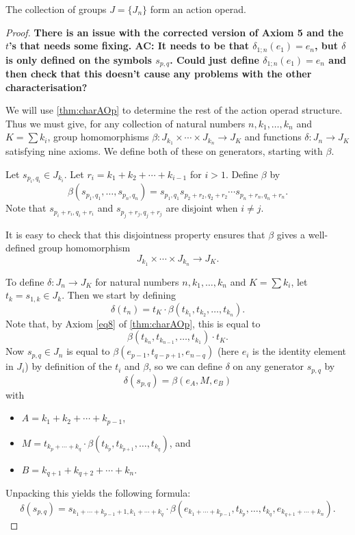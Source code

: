 \begin{thm}\label{J_aop}
The collection of groups $J = \{ J_{n} \}$ form an action operad.
\end{thm}
\begin{proof}
\textbf{There is an issue with the corrected version of Axiom 5 and the $t$'s that needs some fixing. AC: It needs to be that $\delta_{1;n}(e_1) = e_n$, but $\delta$ is only defined on the symbols $s_{p,q}$. Could just define $\delta_{1;n}(e_1) = e_n$ and then check that this doesn't cause any problems with the other characterisation?}

We will use \cref{thm:charAOp} to determine the rest of the action operad structure. Thus we must give, for any collection of natural numbers $n, k_{1}, \ldots, k_{n}$ and $K = \sum k_{i}$, group homomorphisms $\beta \colon J_{k_{1}} \times \cdots \times J_{k_{n}} \rightarrow J_{K}$ and functions $\delta \colon J_{n} \rightarrow J_{K}$ satisfying nine axioms. We define both of these on generators, starting with $\beta$.

Let $s_{p_{i}, q_{i}} \in J_{k_{i}}$. Let $r_{i} = k_{1} + k_{2} + \cdots + k_{i-1}$ for $i > 1$. Define $\beta$ by
  \[
    \beta(s_{p_{1}, q_{1}}, \ldots, s_{p_{n}, q_{n}}) = s_{p_{1}, q_{1}} s_{p_{2}+r_{2}, q_{2}+r_{2}} \cdots s_{p_{n}+r_{n}, q_{n}+r_{n}}.
  \]
Note that $s_{p_{i}+r_{i}, q_{i}+r_{i}}$ and $s_{p_{j}+r_{j}, q_{j}+r_{j}}$ are disjoint when $i \neq j$.

It is easy to check that this disjointness property ensures that $\beta$ gives a well-defined group homomorphism
  \[
    J_{k_{1}} \times \cdots \times J_{k_{n}} \rightarrow J_{K}.
  \]

To define $\delta \colon J_{n} \rightarrow J_{K}$ for natural numbers $n, k_{1}, \ldots, k_{n}$ and $K = \sum k_{i}$, let $t_{k} = s_{1,k} \in J_{k}$. Then we start by defining
  \[
    \delta(t_{n}) = t_{K} \cdot \beta(t_{k_{1}}, t_{k_{2}}, \ldots, t_{k_{n}}).
  \]
Note that, by Axiom \ref{eq8} of \cref{thm:charAOp}, this is equal to
  \[
    \beta(t_{k_{n}}, t_{k_{n-1}}, \ldots, t_{k_{1}}) \cdot t_{K}.
  \]
Now $s_{p,q} \in J_{n}$ is equal to $\beta(e_{p-1}, t_{q-p+1}, e_{n-q})$ (here $e_{i}$ is the identity element in $J_{i}$) by definition of the $t_{i}$ and $\beta$, so we can define $\delta$ on any generator $s_{p,q}$ by
  \[
    \delta(s_{p,q}) = \beta ( e_{A}, M, e_{B} )
  \]
with
  \begin{itemize}
    \item $A = k_{1} + k_{2} + \cdots + k_{p-1}$,
    \item $M = t_{k_{p}+ \cdots +k_{q}} \cdot \beta(t_{k_{p}}, t_{k_{p+1}}, \ldots, t_{k_{q}})$, and
    \item $B = k_{q+1} + k_{q+2} + \cdots + k_{n}$.
  \end{itemize}
Unpacking this yields the following formula:
  \[
  \delta(s_{p,q}) = s_{k_{1}+\cdots+k_{p-1}+1, k_{1}+\cdots+k_{q}} \cdot \beta(e_{k_{1}+\cdots+k_{p-1}}, t_{k_{p}}, \ldots, t_{k_{q}}, e_{k_{q+1}+\cdots+k_{n}}).
  \]


\end{proof}
